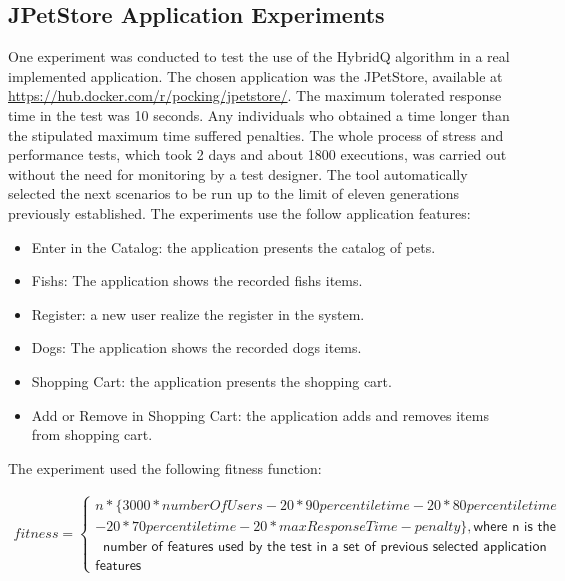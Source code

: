 \subsection{JPetStore Application Experiments}

One experiment was conducted to test the use of the HybridQ algorithm in a real implemented application. The chosen application was the JPetStore, available at \url{https://hub.docker.com/r/pocking/jpetstore/}. The maximum tolerated response time in the test was 10 seconds.  Any  individuals who obtained a time longer than the stipulated maximum time suffered penalties.  The whole process of stress and performance tests, which took 2 days and about 1800 executions, was carried out without the need for monitoring by a test designer. The tool automatically selected the next scenarios to be run up to the limit of eleven generations previously established. The experiments use the follow application features:


\begin{itemize}
\item Enter in the Catalog: the application presents the catalog of pets.
\item Fishs: The application shows the recorded fishs items.
\item Register:  a new user realize the register in the system.
\item Dogs: The application shows the recorded dogs items.
\item Shopping Cart: the application presents the shopping cart.
\item Add or Remove in Shopping Cart: the application adds and removes items from shopping cart.
\end{itemize}


The experiment used the following fitness function:

\begin{equation}
\begin{aligned}
fitness=\begin{cases} n*\{3000*numberOfUsers-20* 90percentiletime-20*80percentiletime\\-20*70percentiletime
-20*maxResponseTime-penalty\} , \textsf{where n is the }\\\ \textsf{ number of features used by the test in a set of previous selected application} \\ \textsf{features}
\end{cases}
\end{aligned}
\end{equation}



